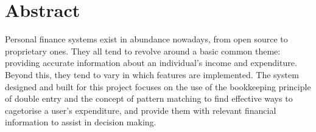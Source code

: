 \section*{Abstract} \label{sec:Abstract}
Personal finance systems exist in abundance nowadays, from open source to
proprietary ones. They all tend to revolve around a basic common theme:
providing accurate information about an individual's income and expenditure.
Beyond this, they tend to vary in which features are implemented. The system
designed and built for this project focuses on the use of the bookkeeping
principle of double entry and the concept of pattern matching to find effective
ways to cagetorise a user's expenditure, and provide them with relevant
financial information to assist in decision making.
